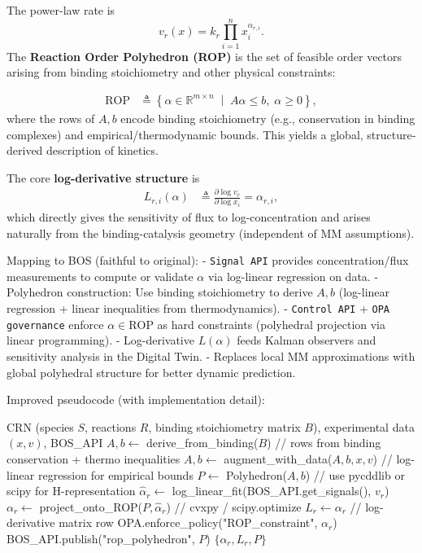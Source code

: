 \documentclass[11pt,a4paper]{article}
\begin{document}
The power-law rate is
\[
v_r(x) = k_r \prod_{i=1}^n x_i^{\alpha_{r,i}}.
\]
The \textbf{Reaction Order Polyhedron (ROP)} is the set of feasible order vectors arising from binding stoichiometry and other physical constraints:

\begin{align}
\text{ROP} &\triangleq \left\{ \alpha \in \mathbb{R}^{m \times n} \;\middle|\; A \alpha \leq b,\; \alpha \geq 0 \right\},
\end{align}
where the rows of \(A, b\) encode binding stoichiometry (e.g., conservation in binding complexes) and empirical/thermodynamic bounds. This yields a global, structure-derived description of kinetics.

The core \textbf{log-derivative structure} is
\begin{align}
L_{r,i}(\alpha) &\triangleq \frac{\partial \log v_r}{\partial \log x_i} = \alpha_{r,i},
\end{align}
which directly gives the sensitivity of flux to log-concentration and arises naturally from the binding-catalysis geometry (independent of MM assumptions).

Mapping to BOS (faithful to original):
- \texttt{Signal API} provides concentration/flux measurements to compute or validate \(\alpha\) via log-linear regression on data.
- Polyhedron construction: Use binding stoichiometry to derive \(A, b\) (log-linear regression + linear inequalities from thermodynamics).
- \texttt{Control API} + \texttt{OPA governance} enforce \(\alpha \in \text{ROP}\) as hard constraints (polyhedral projection via linear programming).
- Log-derivative \(L(\alpha)\) feeds Kalman observers and sensitivity analysis in the Digital Twin.
- Replaces local MM approximations with global polyhedral structure for better dynamic prediction.

Improved pseudocode (with implementation detail):

\begin{algorithmic}[1]
\REQUIRE CRN (species \(S\), reactions \(R\), binding stoichiometry matrix \(B\)), experimental data \((x, v)\), BOS\_API
\STATE \(A, b \leftarrow\) derive\_from\_binding(\(B\))  // rows from binding conservation + thermo inequalities
\STATE \(A, b \leftarrow\) augment\_with\_data(\(A, b, x, v\))  // log-linear regression for empirical bounds
\STATE \(P \leftarrow\) Polyhedron(\(A, b\))  // use pycddlib or scipy for H-representation
    \STATE \(\hat{\alpha}_r \leftarrow\) log\_linear\_fit(BOS\_API.get\_signals(), \(v_r\))
    \STATE \(\alpha_r \leftarrow\) project\_onto\_ROP(\(P, \hat{\alpha}_r\))  // cvxpy / scipy.optimize
    \STATE \(L_r \leftarrow \alpha_r\)  // log-derivative matrix row
    \STATE OPA.enforce\_policy("ROP\_constraint", \(\alpha_r\))
\ENDFOR
\STATE BOS\_API.publish("rop_polyhedron", \(P\))
\RETURN \(\{\alpha_r, L_r, P\}\)
\end{algorithmic}
\end{document}
